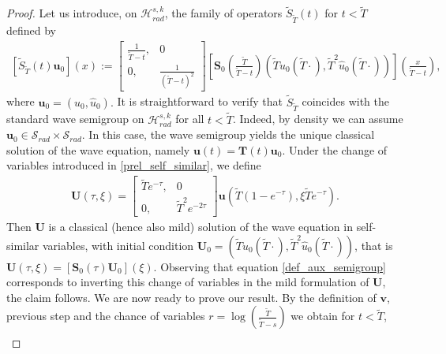 \documentclass[12pt,reqno]{amsart}
\theoremstyle{plain}
\theoremstyle{remark}
\theoremstyle{plain}
\theoremstyle{definition}
\numberwithin{equation}{section}
\numberwithin{equation}{section}
\newcommand{\HH}{\mathcal{H}}
\begin{document}
	\begin{proof}
		Let us introduce, on $\HH_{rad}^{s,k}$, the family of operators $\tilde{S}_{\tilde{T}}(t)$ for $t<\tilde{T}$ defined by 
		\begin{align}\label{def_aux_semigroup}
			[\tilde{S}_{\tilde{T}}(t)\mathbf{u}_0](x):=\begin{bmatrix}  \frac{1}{\tilde{T}-t}, & 0\\ 0, & \frac{1}{(\tilde{T}-t)^2}\end{bmatrix} 
			\left[\mathbf{S}_0\left(\frac{\tilde{T}}{\tilde{T}-t}\right)\left(\tilde{T} u_0(\tilde{T}\cdot),\tilde{T}^2 \hat{u}_0(\tilde{T} \cdot)\right)  \right]\left(\frac{x}{\tilde{T}-t}\right), 
		\end{align}
		where $ \mathbf{u}_0=(u_0,\hat{u}_0).$ It is straightforward to verify that $\tilde{S}_{\tilde{T}}$ coincides with the standard wave semigroup on $\HH_{rad}^{s,k}$ for all $t<\tilde{T}$. Indeed, by density we can assume $\mathbf{u}_0\in \mathscr{S}_{rad}\times \mathscr{S}_{rad}$. In this case, the wave semigroup yields the unique classical solution of the wave equation, namely $\mathbf{u}(t)=\mathbf{T}(t)\mathbf{u}_0.$ Under the change of variables introduced in \autoref{prel_self_similar}, we define
		\begin{align*}
			\mathbf{U}(\tau,\xi)=\begin{bmatrix}\tilde{T} e^{-\tau} ,& 0\\ 0,& \tilde{T}^2 e^{-2\tau}\end{bmatrix}\mathbf{u}(\tilde{T} (1-e^{-\tau}),\xi \tilde{T} e^{-\tau}).
		\end{align*}
		Then $\mathbf{U}$ is a classical (hence also mild) solution of the wave equation in self-similar variables, with initial condition 
		$\mathbf{U}_0=(\tilde{T} u_0(\tilde{T}\cdot),\tilde{T}^2 \hat{u}_0(\tilde{T}\cdot))$, that is $\mathbf{U}(\tau,\xi)=[\mathbf{S}_0(\tau)\mathbf{U}_0](\xi).$ Observing that equation \eqref{def_aux_semigroup} corresponds to inverting this change of variables in the mild formulation of $\mathbf{U}$, the claim follows. We are now ready to prove our result. By the definition of $\mathbf{v}$, previous step and the chance of variables $r=\log(\frac{\tilde{T}}{\tilde{T}-s})$ we obtain for $t<\tilde{T}$, 
		\begin{align}

\end{align}
\end{proof}
\end{document}
